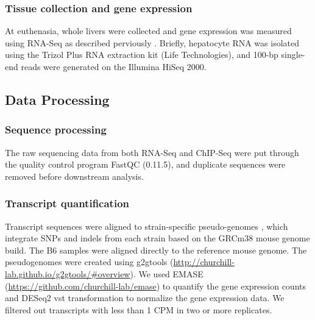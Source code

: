 \documentclass[
  11pt,
]{article}
\providecommand{\DIFaddtex}[1]{{\protect\color{blue}\uwave{#1}}} %
\providecommand{\DIFaddbegin}{} %
\providecommand{\DIFaddend}{} %
\providecommand{\DIFadd}[1]{\texorpdfstring{\DIFaddtex{#1}}{#1}} %
\newcommand{\DIFaddincludegraphics}[2][]{{\color{blue}\fbox{\DIFOincludegraphics[#1]{#2}}}} %
\DeclareRobustCommand{\DIFaddbegin}{\DIFOaddbegin \let\includegraphics\DIFaddincludegraphics} %
\DeclareRobustCommand{\DIFaddend}{\DIFOaddend \let\includegraphics\DIFOincludegraphics} %
\begin{document}
\hypertarget{tissue-collection-and-gene-expression}{%
\subsubsection{Tissue collection and gene
expression}\label{tissue-collection-and-gene-expression}}

At euthenasia, whole livers were collected and gene expression was
measured using RNA-Seq as described perviously
\citep{pmid27309819, pmid28592500}. Briefly, hepatocyte RNA was isolated
using the Trizol Plus RNA extraction kit (Life Technologies), and 100-bp
single-end reads were generated on the Illumina HiSeq 2000.

\hypertarget{data-processing}{%
\subsection{Data Processing}\label{data-processing}}

\hypertarget{sequence-processing}{%
\subsubsection{Sequence processing}\label{sequence-processing}}

The raw sequencing data from both RNA-Seq and ChIP-Seq were put through
the quality control program FastQC (0.11.5), and duplicate sequences
were removed before downstream analysis.

\hypertarget{transcript-quantification}{%
\subsubsection{Transcript
quantification}\label{transcript-quantification}}

Transcript sequences were aligned to strain-specific pseudo-genomes
\citep{pmid27309819}, which integrate SNPs and indels from each strain
based on the GRCm38 mouse genome build. The B6 samples were aligned
directly to the reference mouse genome. The pseudogenomes were created
using g2gtools
(\url{http://churchill-lab.github.io/g2gtools/\#overview}). We used
EMASE (\url{https://github.com/churchill-lab/emase})
\DIFaddbegin \DIFadd{\mbox{%
\citep{pmid29444201} }\hspace{0pt}%
}\DIFaddend to quantify the gene expression counts and DESeq2
vst transformation \citep{love2014moderated} to normalize the gene
expression data. We filtered out transcripts with less than 1 CPM in two
or more replicates.
\end{document}
